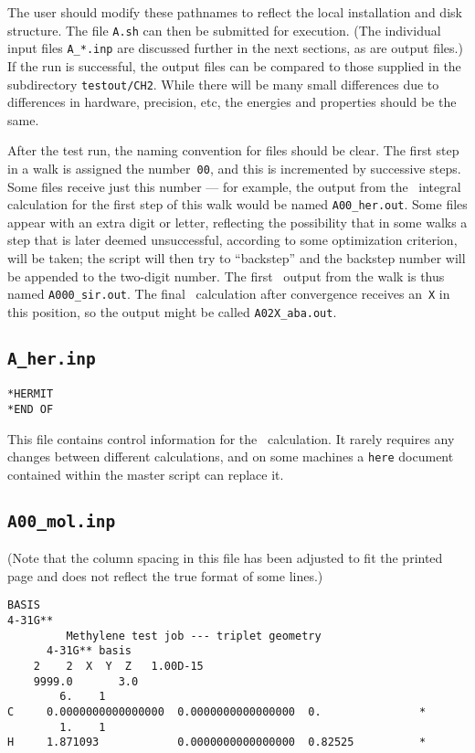 The user should modify these pathnames to reflect the local
installation and disk structure.  The file \verb|A.sh| can then be
submitted for execution.  (The individual input files \verb|A_*.inp|
are discussed further in the next sections, as are output files.)  If
the run is successful, the output files can be compared to those
supplied in the subdirectory \verb|testout/CH2|.  While there will be
many small differences due to differences in hardware, precision, etc,
the energies and properties should be the same.

After the test run, the naming convention for files should be clear.
The first step in a walk is assigned the number~\verb|00|, and this is
incremented by successive steps.  Some files receive just this number
--- for example, the output from the \her\ integral calculation for
the first step of this walk would be named \verb|A00_her.out|.  Some
files appear with an extra digit or letter, reflecting the possibility
that in some walks a step that is later deemed unsuccessful, according
to some optimization criterion, will be taken; the script will then
try to ``backstep'' and the backstep number will be appended to the
two-digit number.  The first \sir\ output from the walk is thus named
\verb|A000_sir.out|.  The final \aba\ calculation after convergence
receives an~\verb|X| in this position, so the output might be called
\verb|A02X_aba.out|. 

\subsection{{\tt A\_her.inp}}

\begin{verbatim}
*HERMIT
*END OF
\end{verbatim}

This file contains control information for the \her\ calculation.  It
rarely requires any changes between different calculations, and on
some machines a \verb|here| document contained within the master
script can replace it.

\subsection{{\tt A00\_mol.inp}}

(Note that the column spacing in this file has been adjusted to
fit the printed page and does not reflect the true format of some
lines.) 
\begin{verbatim}
BASIS
4-31G**
         Methylene test job --- triplet geometry
      4-31G** basis
    2    2  X  Y  Z   1.00D-15
    9999.0       3.0
        6.    1
C     0.0000000000000000  0.0000000000000000  0.               *
        1.    1
H     1.871093            0.0000000000000000  0.82525          *
\end{verbatim}

